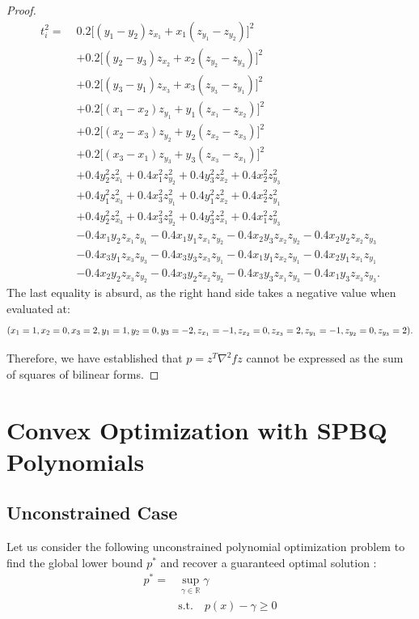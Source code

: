 \documentclass[12pt]{elsarticle}
\theoremstyle{definition}
\begin{document}
\begin{proof}
\begin{align*}
     t_i^2 =\; & 0.2\Big[(y_1 - y_2)z_{x_1} + x_1(z_{y_1} - z_{y_2})\Big]^2 \\
&+ 0.2\Big[(y_2 - y_3)z_{x_2} + x_2(z_{y_2} - z_{y_3})\Big]^2 \\
&+ 0.2\Big[(y_3 - y_1)z_{x_3} + x_3(z_{y_3} - z_{y_1})\Big]^2 \\
&+ 0.2\Big[(x_1 - x_2)z_{y_1} + y_1(z_{x_1} - z_{x_2})\Big]^2 \\
&+ 0.2\Big[(x_2 - x_3)z_{y_2} + y_2(z_{x_2} - z_{x_3})\Big]^2 \\
&+ 0.2\Big[(x_3 - x_1)z_{y_3} + y_3(z_{x_3} - z_{x_1})\Big]^2 \\
&+ 0.4y_2^2z_{x_1}^2 + 0.4x_1^2z_{y_2}^2
+ 0.4y_3^2z_{x_2}^2 + 0.4x_2^2z_{y_3}^2 \\
&+ 0.4y_1^2z_{x_3}^2 + 0.4x_3^2z_{y_1}^2
+ 0.4y_1^2z_{x_2}^2 + 0.4x_2^2z_{y_1}^2 \\
&+ 0.4y_2^2z_{x_3}^2 + 0.4x_3^2z_{y_2}^2
+ 0.4y_3^2z_{x_1}^2 + 0.4x_1^2z_{y_3}^2 \\
&- 0.4x_1y_2z_{x_1}z_{y_1}
- 0.4x_1y_1z_{x_1}z_{y_2}
- 0.4x_2y_3z_{x_2}z_{y_2}
- 0.4x_2y_2z_{x_2}z_{y_3} \\
&- 0.4x_3y_1z_{x_3}z_{y_3}
- 0.4x_3y_3z_{x_3}z_{y_1}
- 0.4x_1y_1z_{x_2}z_{y_1}
- 0.4x_2y_1z_{x_1}z_{y_1} \\
&- 0.4x_2y_2z_{x_3}z_{y_2}
- 0.4x_3y_2z_{x_2}z_{y_2}
- 0.4x_3y_3z_{x_1}z_{y_3}
- 0.4x_1y_3z_{x_3}z_{y_3}.
\end{align*}
The last equality is absurd, as the right hand side takes a negative value when evaluated at:
\[
(x_1 =1, x_2=0, x_3=2, y_1=1, y_2=0, y_3=-2, z_{x_1}=-1, z_{x_2}=0, z_{x_3}=2, z_{y_1}=-1, z_{y_2}=0, \\z_{y_3}=2).
\]

Therefore, we have established that $p=z^T \nabla^2 f z$ cannot be expressed as the sum of squares of bilinear forms.

\end{proof}

\section{Convex Optimization with SPBQ Polynomials}\label{optimization}

\subsection{Unconstrained Case}\label{uncons opt}
Let us consider the following unconstrained polynomial optimization problem to find the global lower bound $p^*$ and recover a guaranteed optimal solution \cite{belousov2002frank}:
\begin{equation}\label{non-neg}
\begin{aligned}
    p^* = &\sup_{\gamma\in \mathbb{R}} \gamma\\
    & \text{s.t.} \quad p(x) - \gamma \geq 0
    \end{aligned}
\end{equation}
\end{document}
